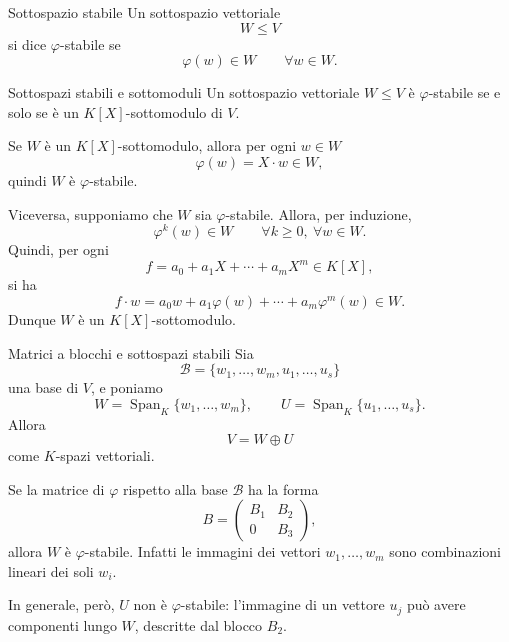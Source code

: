\documentclass[a4paper]{article}
\begin{document}
\begin{radioactive}
\begin{snippetdefinition}{Sottospazio stabile}
    Un sottospazio vettoriale
    \[
        W\leq V
    \]
    si dice \(\varphi\)-stabile se
    \[
        \varphi(w)\in W
        \qquad
        \forall w\in W.
    \]
\end{snippetdefinition}
\end{radioactive}

\begin{radioactive}
\begin{snippetproposition}{Sottospazi stabili e sottomoduli}
    Un sottospazio vettoriale \(W\leq V\) è \(\varphi\)-stabile se e solo se è un \(K[X]\)-sottomodulo di \(V\).
\end{snippetproposition}
\end{radioactive}

\begin{radioactive}
\begin{snippetproof}{}
    Se \(W\) è un \(K[X]\)-sottomodulo, allora per ogni \(w\in W\)
    \[
        \varphi(w)=X\cdot w\in W,
    \]
    quindi \(W\) è \(\varphi\)-stabile.

    Viceversa, supponiamo che \(W\) sia \(\varphi\)-stabile. Allora, per induzione,
    \[
        \varphi^k(w)\in W
        \qquad
        \forall k\geq 0,\ \forall w\in W.
    \]
    Quindi, per ogni
    \[
        f=a_0+a_1X+\cdots+a_mX^m\in K[X],
    \]
    si ha
    \[
        f\cdot w
        =
        a_0w+a_1\varphi(w)+\cdots+a_m\varphi^m(w)\in W.
    \]
    Dunque \(W\) è un \(K[X]\)-sottomodulo.
\end{snippetproof}
\end{radioactive}

\begin{radioactive}
\begin{snippetexample}{Matrici a blocchi e sottospazi stabili}
    Sia
    \[
        \mathcal{B}
        =
        \{w_1,\ldots,w_m,u_1,\ldots,u_s\}
    \]
    una base di \(V\), e poniamo
    \[
        W=\operatorname{Span}_K\{w_1,\ldots,w_m\},
        \qquad
        U=\operatorname{Span}_K\{u_1,\ldots,u_s\}.
    \]
    Allora
    \[
        V=W\oplus U
    \]
    come \(K\)-spazi vettoriali.

    Se la matrice di \(\varphi\) rispetto alla base \(\mathcal{B}\) ha la forma
    \[
        B=
        \begin{pmatrix}
            B_1 & B_2\\
            0 & B_3
        \end{pmatrix},
    \]
    allora \(W\) è \(\varphi\)-stabile. Infatti le immagini dei vettori \(w_1,\ldots,w_m\) sono combinazioni lineari dei soli \(w_i\).

    In generale, però, \(U\) non è \(\varphi\)-stabile: l'immagine di un vettore \(u_j\) può avere componenti lungo \(W\), descritte dal blocco \(B_2\).
\end{snippetexample}
\end{radioactive}
\end{document}
